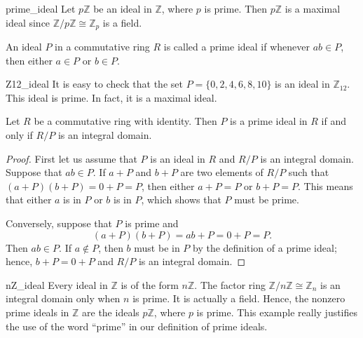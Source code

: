  
\begin{example}{prime_ideal}
Let $p{\mathbb Z}$ be an ideal in ${\mathbb Z}$, where $p$ is prime. Then
$p{\mathbb Z}$  is a maximal ideal since ${\mathbb Z}/ p {\mathbb Z} \cong
{\mathbb Z}_p$ is a field. 
\end{example}
  
 

 
 
An ideal $P$ in a commutative ring $R$ is called a {\bfi prime
ideal\/} if whenever $ab \in P$,
then either $a \in P$ or $b \in P$.
 
 
 
\begin{example}{Z12_ideal}
It is easy to check that the set $P = \{ 0, 2, 4, 6, 8, 10  \}$ is an
ideal in ${\mathbb Z}_{12}$. This ideal is prime. In fact, it is a
maximal ideal.
\end{example}
 
 
\begin{proposition}
Let $R$ be a commutative ring with identity. Then $P$ is a prime ideal
in $R$ if and only if $R/P$ is an integral domain.  
\end{proposition}
 
 
\begin{proof}
First let us assume that $P$ is an ideal in $R$ and $R/P$ is an
integral domain.  Suppose that $ab \in P$. If $a +P$ and $b+P$ are two 
elements of $R/P$ such that $(a+P)(b+P) = 0+P = P$, then either $a + P
= P$ or $b+P = P$.  This means that either $a$ is in $P$ or $b$ is in
$P$, which shows that $P$ must be prime. 
 
 
Conversely, suppose that $P$ is prime and 
\[
(a +P)(b+P) = ab + P = 0 + P = P. 
\]
Then $ab \in P$. If $a \notin P$, then $b$ must be in $P$ by the
definition of a prime ideal; hence, $b + P = 0 + P$ and $R/P$ is an
integral domain. 
\end{proof}
 
 
\begin{example}{nZ_ideal}
Every ideal in ${\mathbb Z}$ is of the form $n {\mathbb Z}$.  The factor
ring ${\mathbb Z} / n{\mathbb Z} \cong {\mathbb Z}_n$ is an integral domain
only when $n$ is prime.  It is actually a field.  Hence, the nonzero
prime ideals in ${\mathbb Z}$ are the ideals $p{\mathbb Z}$, where $p$ is
prime. This example really justifies the use of the word ``prime'' in
our  definition of prime ideals. 
\mbox{\hspace{1in}}  
\end{example}
 
